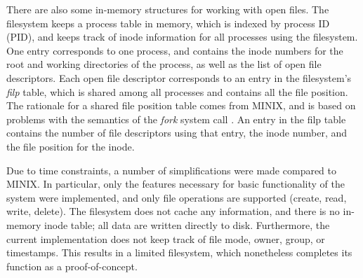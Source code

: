 There are also some in-memory structures for working with open files.
The filesystem keeps a process table in memory, which is indexed by process ID (PID), and keeps track of inode information for all processes using the filesystem.
One entry corresponds to one process, and contains the inode numbers for the root and working directories of the process, as well as the list of open file descriptors.
Each open file descriptor corresponds to an entry in the filesystem's \textit{filp} table, which is shared among all processes and contains all the file position.
The rationale for a shared file position table comes from MINIX, and is based on problems with the semantics of the \textit{fork} system call \cite{tanenbaum1997}.
An entry in the filp table contains the number of file descriptors using that entry, the inode number, and the file position for the inode.

Due to time constraints, a number of simplifications were made compared to MINIX.
In particular, only the features necessary for basic functionality of the system were implemented, and only file operations are supported (create, read, write, delete).
The filesystem does not cache any information, and there is no in-memory inode table; all data are written directly to disk.
Furthermore, the current implementation does not keep track of file mode, owner, group, or timestamps.
This results in a limited filesystem, which nonetheless completes its function as a proof-of-concept.
